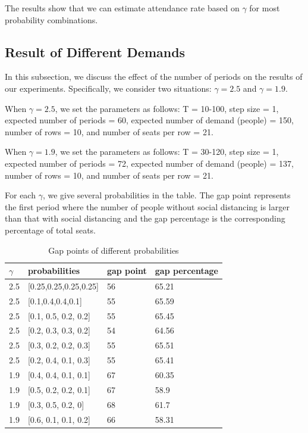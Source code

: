 The results show that we can estimate attendance rate based on $\gamma$ for most probability combinations. 

\subsection{Result of Different Demands}

In this subsection, we discuss the effect of the number of periods on the results of our experiments. Specifically, we consider two situations: $\gamma = 2.5$ and $\gamma = 1.9$.

When $\gamma = 2.5$, we set the parameters as follows: T = 10-100, step size = 1, expected number of periods = 60, expected number of demand (people) = 150, number of rows = 10, and number of seats per row = 21.

When $\gamma = 1.9$, we set the parameters as follows: T = 30-120, step size = 1, expected number of periods = 72, expected number of demand (people) = 137, number of rows = 10, and number of seats per row = 21.

For each $\gamma$, we give several probabilities in the table. The gap point represents the first period where the number of people without social distancing is larger than that with social distancing and the gap percentage is the corresponding percentage of total seats.



\begin{table}[ht]
  \centering
  \caption{Gap points of different probabilities}
  \begin{tabular}{|l|l|l|l|}
  \hline
  $\gamma$  & probabilities & gap point & gap percentage \\
  \hline
  2.5  & [0.25,0.25,0.25,0.25] & 56 & 65.21 \\
  2.5  & [0.1,0.4,0.4,0.1] & 55 & 65.59 \\
  2.5  & [0.1, 0.5, 0.2, 0.2] & 55 & 65.45 \\
  2.5  & [0.2, 0.3, 0.3, 0.2] & 54 & 64.56 \\
  2.5  & [0.3, 0.2, 0.2, 0.3] & 55 & 65.51\\
  2.5  & [0.2, 0.4, 0.1, 0.3] & 55 & 65.41 \\
  1.9  & [0.4, 0.4, 0.1, 0.1] & 67 & 60.35 \\
  1.9  & [0.5, 0.2, 0.2, 0.1] & 67 & 58.9  \\
  1.9  & [0.3, 0.5, 0.2, 0]  &  68 & 61.7  \\
  1.9  & [0.6, 0.1, 0.1, 0.2] & 66 & 58.31 \\
  \hline
  \end{tabular}
\end{table}


